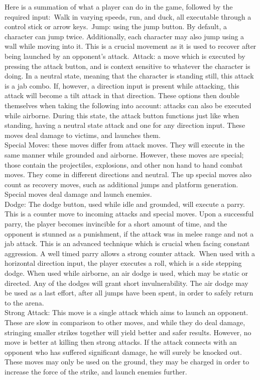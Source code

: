 \documentclass{article}
\begin{document}
Here is a summation of what a player can do in the game, followed by the required input:\
Walk in varying speeds, run, and duck, all executable through a control stick or arrow keys.\
Jump: using the jump button. By default, a character can jump twice. Additionally, each character may also jump using a wall while moving into it. This is a crucial movement as it is used to recover after being launched by an opponent's attack.\
Attack: a move which is executed by pressing the attack button, and is context sensitive to whatever the character is doing. In a neutral state, meaning that the character is standing still, this attack is a jab combo. If, however, a direction input is present while attacking, this attack will become a tilt attack in that direction. These options then double themselves when taking the following into account: attacks can also be executed while airborne. During this state, the attack button functions just like when standing, having a neutral state attack and one for any direction input. These moves deal damage to victims, and launches them.\\
Special Moves: these moves differ from attack moves. They will execute in the same manner while grounded and airborne. However, these moves are special; those contain the projectiles, explosions, and other non hand to hand combat moves. They come in different directions and neutral. The up special moves also count as recovery moves, such as additional jumps and platform generation. Special moves deal damage and launch enemies.\\
Dodge: The dodge button, used while idle and grounded, will execute a parry. This is a counter move to incoming attacks and special moves. Upon a successful parry, the player becomes invincible for a short amount of time, and the opponent is stunned as a punishment, if the attack was in melee range and not a jab attack. This is an advanced technique which is crucial when facing constant aggression. A well timed parry allows a strong counter attack.\
When used with a horizontal direction input, the player executes a roll, which is a side stepping dodge. When used while airborne, an air dodge is used, which may be static or directed. Any of the dodges will grant short invulnerability. The air dodge may be used as a last effort, after all jumps have been spent, in order to safely return to the arena.\\
Strong Attack: This move is a single attack which aims to launch an opponent. These are slow in comparison to other moves, and while they do deal damage, stringing smaller strikes together will yield better and safer results. However, no move is better at killing then strong attacks. If the attack connects with an opponent who has suffered significant damage, he will surely be knocked out. These moves may only be used on the ground, they may be charged in order to increase the force of the strike, and launch enemies further.\\
\end{document}
